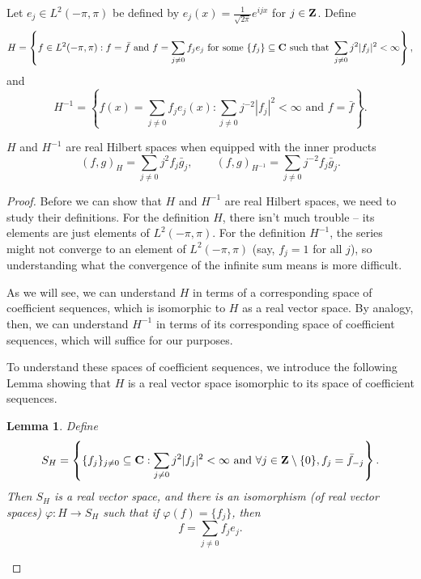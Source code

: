 \documentclass{homework}
\newtheorem{lemma}{Lemma}
\begin{document}
	\question
	\newcommand{\ltwo}{{L^2(-\pi,\pi)}}
	\newcommand{\hm}{{H^{-1}}}
	Let $e_j \in \ltwo$ be defined by $e_j(x) = \frac{1}{\sqrt{2\pi}}e^{ijx}$ for $j \in \textbf{Z}$. Define
	\begin{equation}
		H = \left\{f \in \ltwo : f = \bar{f}\text{ and }f = \sum_{j\ne 0}f_je_j \text{ for some } \{f_j\}\subseteq \C \text{ such that } \sum_{j\ne 0} j^2|f_j|^2 < \infty \right\},
	\end{equation}
	and
	\begin{equation}
		\hm = \left\{f(x) = \sum_{j\ne 0}f_je_j(x) : \sum_{j\ne 0}j^{-2}|f_j |^2 < \infty \text{ and } f = \bar{f}\right\}.
	\end{equation}
	\begin{arabicparts}
		\questionpart
		$H$ and $\hm$ are real Hilbert spaces when equipped with the inner products
		\begin{equation}
			(f,g)_H = \sum_{j\ne 0}j^2f_j\bar{g}_j,\qquad(f,g)_\hm = \sum_{j\ne 0}j^{-2}f_j\bar{g}_j.
		\end{equation}
		
		\begin{proof}
		Before we can show that $H$ and $\hm$ are real Hilbert spaces, we need to study their definitions. For the definition $H$, there isn't much trouble -- its elements are just elements of $\ltwo$. For the definition $H^{-1}$, the series might not converge to an element of $\ltwo$ (say, $f_j = 1$ for all $j$), so understanding what the convergence of the infinite sum means is more difficult. 
		
		As we will see, we can understand $H$ in terms of a corresponding space of coefficient sequences, which is isomorphic to $H$ as a real vector space. By analogy, then, we can understand $H^{-1}$ in terms of its corresponding space of coefficient sequences, which will suffice for our purposes.
		
		To understand these spaces of coefficient sequences, we introduce the following Lemma showing that $H$ is a real vector space isomorphic to its space of coefficient sequences.
		\begin{lemma}
		Define
		\begin{equation}
			S_H = \left\{\{f_j\}_{j \ne 0} \subseteq \textbf{C} : \sum_{j\ne 0}j^2|f_j|^2 < \infty \textnormal{ and } \forall j \in \textbf{Z} \setminus\{0\}, f_j = \bar{f}_{-j} \right\}.
		\end{equation}
		Then $S_H$ is a real vector space, and there is an isomorphism (of real vector spaces) $\varphi : H \to S_H$ such that if $\varphi(f) = \{f_j\}$, then
		\begin{equation}
			f = \sum_{j\ne 0}f_je_j.
		\end{equation}
		

\end{lemma}
\end{proof}
\end{arabicparts}
\end{document}
